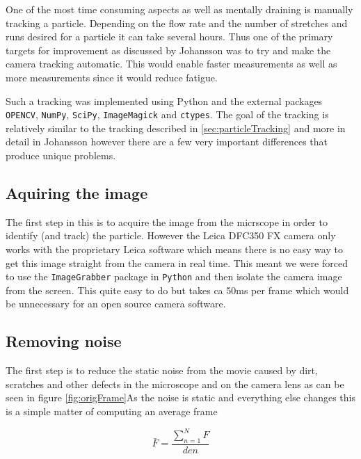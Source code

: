 %
%
%
%
%

One of the most time consuming aspects as well as mentally draining is manually tracking a particle. Depending on the flow rate and the number of stretches and runs desired for a particle it can take several hours. Thus one of the primary targets for improvement as discussed by Johansson \cite{AntonThesis} was to try and make the camera tracking automatic. This would enable faster measurements as well as more measurements since it would reduce fatigue. 

Such a tracking was implemented using Python and the external packages \texttt{OPENCV}, \texttt{NumPy}, \texttt{SciPy}, \texttt{ImageMagick} and \texttt{ctypes}. The goal of the tracking is relatively similar to the tracking described in \ref{sec:particleTracking} and more in detail in Johansson \cite{AntonThesis} however there are a few very important differences that produce unique problems. 

\subsection{Aquiring the image}
The first step in this is to acquire the image from the micrscope in order to identify (and track) the particle. However the Leica DFC350 FX camera only works with the proprietary Leica software which means there is no easy way to get this image straight from the camera in real time. This meant we were forced to use the \texttt{ImageGrabber} package in \texttt{Python} and then isolate the camera image from the screen. This quite easy to do but takes ca 50ms per frame which would be unnecessary for an open source camera software. 

\subsection{Removing noise}
The first step is to reduce the static noise from the movie caused by dirt, scratches and other defects in the microscope and on the camera lens as can be seen in figure \ref{fig:origFrame}As the noise is static and everything else changes this is a simple matter of computing an average frame

\begin{equation}\label{eq:averageFrame}
\bar{F} = \frac{\sum\limits_{n=1}^{N} F }{den}
\end{equation}

